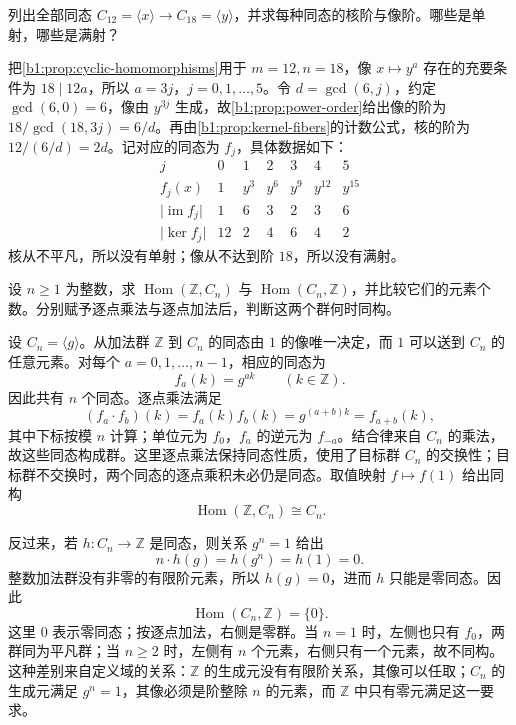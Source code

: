 \begin{exercise}\label{b1:ex:03-cyclic-hom}
	列出全部同态 \(C_{12}=\langle x\rangle\rightarrow C_{18}=\langle y\rangle\)，并求每种同态的核阶与像阶。哪些是单射，哪些是满射？
\end{exercise}
\begin{solution}
	把\cref{b1:prop:cyclic-homomorphisms}用于 \(m=12,n=18\)，像 \(x\mapsto y^a\) 存在的充要条件为 \(18\mid12a\)，所以 \(a=3j\)，\(j=0,1,\ldots,5\)。令 \(d=\gcd(6,j)\)，约定 \(\gcd(6,0)=6\)，像由 \(y^{3j}\) 生成，故\cref{b1:prop:power-order}给出像的阶为 \(18/\gcd(18,3j)=6/d\)。再由\cref{b1:prop:kernel-fibers}的计数公式，核的阶为 \(12/(6/d)=2d\)。记对应的同态为 \(f_j\)，具体数据如下：
	\[
		\begin{array}{c|rrrrrr}
			j&0&1&2&3&4&5\\\hline f_j(x)&1&y^3&y^6&y^9&y^{12}&y^{15}\\
			\lvert\operatorname{im}f_j\rvert&1&6&3&2&3&6\\
			\lvert\ker f_j\rvert&12&2&4&6&4&2
		\end{array}
	\]
	核从不平凡，所以没有单射；像从不达到阶 \(18\)，所以没有满射。
\end{solution}

\begin{exercise}\label{b1:ex:03-infinite-cyclic-hom}
	设 \(n\geq1\) 为整数，求 \(\operatorname{Hom}(\mathbb Z,C_n)\) 与 \(\operatorname{Hom}(C_n,\mathbb Z)\)，并比较它们的元素个数。分别赋予逐点乘法与逐点加法后，判断这两个群何时同构。
\end{exercise}
\begin{solution}
	设 \(C_n=\langle g\rangle\)。从加法群 \(\mathbb Z\) 到 \(C_n\) 的同态由 \(1\) 的像唯一决定，而 \(1\) 可以送到 \(C_n\) 的任意元素。对每个 \(a=0,1,\ldots,n-1\)，相应的同态为
	\[
		f_a(k)=g^{ak}\qquad(k\in\mathbb Z).
	\]
	因此共有 \(n\) 个同态。逐点乘法满足
	\[
		(f_a\cdot f_b)(k)=f_a(k)f_b(k)=g^{(a+b)k}=f_{a+b}(k),
	\]
	其中下标按模 \(n\) 计算；单位元为 \(f_0\)，\(f_a\) 的逆元为 \(f_{-a}\)。结合律来自 \(C_n\) 的乘法，故这些同态构成群。这里逐点乘法保持同态性质，使用了目标群 \(C_n\) 的交换性；目标群不交换时，两个同态的逐点乘积未必仍是同态。取值映射 \(f\mapsto f(1)\) 给出同构
	\[
		\operatorname{Hom}(\mathbb Z,C_n)\cong C_n.
	\]

	反过来，若 \(h:C_n\to\mathbb Z\) 是同态，则关系 \(g^n=1\) 给出
	\[
		n\cdot h(g)=h(g^n)=h(1)=0.
	\]
	整数加法群没有非零的有限阶元素，所以 \(h(g)=0\)，进而 \(h\) 只能是零同态。因此
	\[
		\operatorname{Hom}(C_n,\mathbb Z)=\{0\}.
	\]
	这里 \(0\) 表示零同态；按逐点加法，右侧是零群。当 \(n=1\) 时，左侧也只有 \(f_0\)，两群同为平凡群；当 \(n\geq2\) 时，左侧有 \(n\) 个元素，右侧只有一个元素，故不同构。这种差别来自定义域的关系：\(\mathbb Z\) 的生成元没有有限阶关系，其像可以任取；\(C_n\) 的生成元满足 \(g^n=1\)，其像必须是阶整除 \(n\) 的元素，而 \(\mathbb Z\) 中只有零元满足这一要求。
\end{solution}

